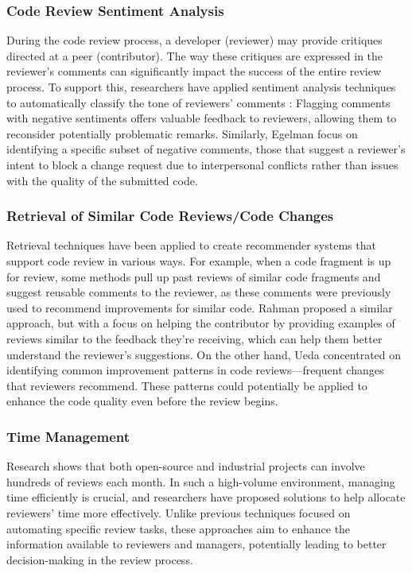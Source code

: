 \subsubsection{Code Review Sentiment Analysis}

During the code review process, a developer (reviewer) may provide critiques
directed at a peer (contributor). The way these critiques are expressed in the
reviewer’s comments can significantly impact the success of the entire review
process. To support this, researchers have applied sentiment analysis
techniques to automatically classify the tone of reviewers' comments
\cite{ahmed:ase2017}: Flagging comments with negative sentiments offers
valuable feedback to reviewers, allowing them to reconsider potentially
problematic remarks. Similarly, Egelman \etal \cite{egelman:icse2020} focus on
identifying a specific subset of negative comments, \ie those that suggest a
reviewer’s intent to block a change request due to interpersonal conflicts
rather than issues with the quality of the submitted code.

\subsubsection{Retrieval of Similar Code Reviews/Code Changes}
Retrieval techniques have been applied to create recommender systems that
support code review in various ways. For example, when a code fragment is up
for review, some methods \cite{guo2020review,gupta:sigkdd2018,siow:saner2020}
pull up past reviews of similar code fragments and suggest reusable comments to
the reviewer, as these comments were previously used to recommend improvements
for similar code. Rahman \etal \cite{rahman:esem2022} proposed a similar
approach, but with a focus on helping the contributor by providing examples of
reviews similar to the feedback they’re receiving, which can help them better
understand the reviewer’s suggestions. On the other hand, Ueda \etal
\cite{ueda:iwsc2019} concentrated on identifying common improvement patterns in
code reviews—frequent changes that reviewers recommend. These patterns could
potentially be applied to enhance the code quality even before the review
begins.

\subsubsection{Time Management}
Research shows that both open-source and industrial projects can involve
hundreds of reviews each month. In such a high-volume environment, managing
time efficiently is crucial, and researchers have proposed solutions to help
allocate reviewers’ time more effectively. Unlike previous techniques focused
on automating specific review tasks, these approaches aim to enhance the
information available to reviewers and managers, potentially leading to better
decision-making in the review process.

